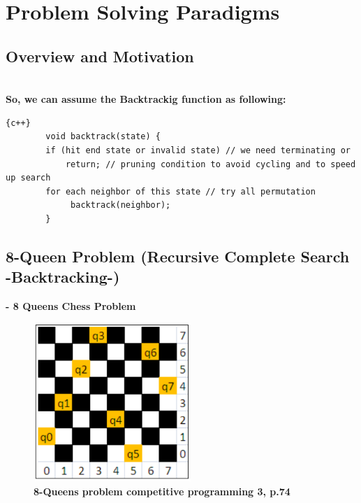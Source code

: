 \chapter{Problem Solving Paradigms}
\label{chap:ProblemSolvingParadigms}

\section{Overview and Motivation}

\large{}
\\
\newline
\textbf{{\Large{So, we can assume the Backtrackig function as following:}}}


\begin{lstlisting}{c++}
        void backtrack(state) {
        if (hit end state or invalid state) // we need terminating or
            return; // pruning condition to avoid cycling and to speed up search
        for each neighbor of this state // try all permutation
             backtrack(neighbor);
        }
\end{lstlisting}

\newpage


\section{8-Queen Problem (Recursive Complete Search -Backtracking-)}
\label{8-Queen}

\href{https://vj.z180.cn/a1d3d6853584bb15ac7da3eeee0977ca?v=1575822738}{}\textbf{ - 8 Queens Chess Problem}

\begin{figure}[h]
    \centering
\includegraphics[width=6cm, height=6cm]{8-queen-problem.png}
 \caption{\textbf{8-Queens problem competitive programming 3, p.74}}
    \label{fig:8-queen-problem}
\end{figure}

